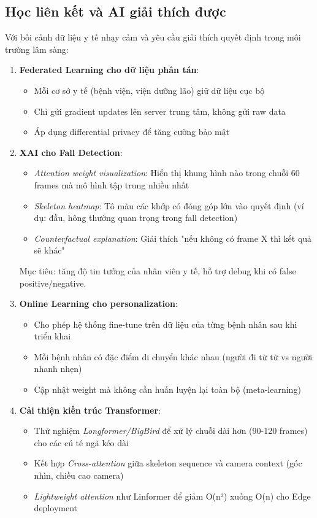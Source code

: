 \subsection{Học liên kết và AI giải thích được}
\label{sec:future_federated_xai}

Với bối cảnh dữ liệu y tế nhạy cảm và yêu cầu giải thích quyết định trong môi trường lâm sàng:

\begin{enumerate}
    \item \textbf{Federated Learning cho dữ liệu phân tán}:
    \begin{itemize}
        \item Mỗi cơ sở y tế (bệnh viện, viện dưỡng lão) giữ dữ liệu cục bộ
        \item Chỉ gửi gradient updates lên server trung tâm, không gửi raw data
        \item Áp dụng differential privacy để tăng cường bảo mật
    \end{itemize}
    
    \item \textbf{XAI cho Fall Detection}:
    \begin{itemize}
        \item \textit{Attention weight visualization}: Hiển thị khung hình nào trong chuỗi 60 frames mà mô hình tập trung nhiều nhất
        \item \textit{Skeleton heatmap}: Tô màu các khớp có đóng góp lớn vào quyết định (ví dụ: đầu, hông thường quan trọng trong fall detection)
        \item \textit{Counterfactual explanation}: Giải thích "nếu không có frame X thì kết quả sẽ khác"
    \end{itemize}
    Mục tiêu: tăng độ tin tưởng của nhân viên y tế, hỗ trợ debug khi có false positive/negative.
    
    \item \textbf{Online Learning cho personalization}:
    \begin{itemize}
        \item Cho phép hệ thống fine-tune trên dữ liệu của từng bệnh nhân sau khi triển khai
        \item Mỗi bệnh nhân có đặc điểm di chuyển khác nhau (người đi từ từ vs người nhanh nhẹn)
        \item Cập nhật weight mà không cần huấn luyện lại toàn bộ (meta-learning)
    \end{itemize}
    
    \item \textbf{Cải thiện kiến trúc Transformer}:
    \begin{itemize}
        \item Thử nghiệm \textit{Longformer/BigBird} để xử lý chuỗi dài hơn (90-120 frames) cho các cú té ngã kéo dài
        \item Kết hợp \textit{Cross-attention} giữa skeleton sequence và camera context (góc nhìn, chiều cao camera)
        \item \textit{Lightweight attention} như Linformer để giảm O(n²) xuống O(n) cho Edge deployment
    \end{itemize}
\end{enumerate}

